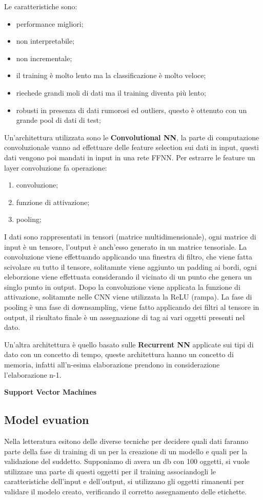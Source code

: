 \documentclass[12pt]{article}
\begin{document}
Le caratteristiche sono:
\begin{itemize}
    \item performance migliori;
    \item non interpretabile;
    \item non incrementale;
    \item il training \`e molto lento ma la classificazione \`e molto veloce;
    \item riechede grandi moli di dati ma il training diventa pi\`u lento;
    \item robusti in presenza di dati rumorosi ed outliers, questo \`e ottenuto con un grande pool di dati di test;
\end{itemize}

Un'architettura utilizzata sono le \textbf{Convolutional NN}, la parte di computazione convoluzionale vanno ad effettuare delle feature selection sui dati in input, questi dati vengono poi mandati in input in una rete FFNN. Per estrarre le feature un layer convoluzione fa operazione:
\begin{enumerate}
    \item convoluzione;
    \item funzione di attivazione;
    \item pooling;
\end{enumerate}
I dati sono rappresentati in tensori (matrice multidimensionale), ogni matrice di input \`e un tensore, l'output \`e anch'esso generato in un matrice tensoriale. La convoluzione viene effettuando applicando una finestra di filtro, che viene fatta scivolare su tutto il tensore, solitamnte viene aggiunto un padding ai bordi, ogni eleborzione viene effettuata considerando il vicinato di un punto che genera un singlo punto in output. Dopo la convoluzione viene applicata la funzione di attivazione, solitamnte nelle CNN viene utilizzata la ReLU (rampa). La fase di pooling \`e una fase di downsampling, viene fatto applicando dei filtri al tensore in output, il risultato finale \`e un assegnazione di tag ai vari oggetti presenti nel dato.

Un'altra architettura \`e quello basato sulle \textbf{Recurrent NN} applicate sui tipi di dato con un concetto di tempo, queste architettura hanno un concetto di memoria, infatti all'n-esima elaborazione prendono in considerazione l'elaborazione n-1.

\textbf{Support Vector Machines}



\subsection{Model evuation}
Nella letteratura esitono delle diverse tecniche per decidere quali dati faranno parte della fase di training di un per la creazione di un modello e quali per la validazione del suddetto. Supponiamo di avera un db con 100 oggetti, si vuole utilizzare una parte di questi oggetti per il training associandogli le caratteristiche dell'input e dell'output, si utilizzano gli oggetti rimanenti per validare il modelo creato, verificando il corretto assegnamento delle etichette. 
\end{document}
